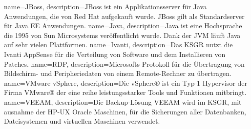 
\makenoidxglossaries
{}
{
        name=JBoss,
        description={JBoss ist ein Applikationsserver für \Gls{Java} Anwendungen, die von Red Hat aufgekauft wurde.
        JBoss gilt als Standardserver für Java EE Anwendungen\cite{U4ZJDNI2}.}
}
{
        name=Java,
        description={Java ist eine Hochsprache die 1995 von Sun Microsystems veröffentlicht wurde.
Dank der JVM läuft Java auf sehr vielen Plattformen\cite{6H25Z3UI}.}
}
{
        name=Ivanti,
        description={Das KSGR nutzt die Ivanti AppSense\cite{LPHK6T9X, 8CHLH32N} für die Verteilung von Software und dem Installieren von Patches.}
}
{
        name=RDP,
        description={Microsofts Protokoll für die Übertragung von Bildschirm- und Peripheriedaten von einem Remote-Rechner zu übertragen\cite{9PJHPCRS}.}
}
{
        name=VMware vSphere,
        description={Die vSphere® ist ein Typ-1 Hypervisor der Firma VMware® der eine reihe leistungsstarker Tools und Funktionen mitbringt.}
}
{
        name=VEEAM,
        description={Die Backup-Lösung VEEAM wird im KSGR, mit ausnahme der HP-UX Oracle Maschinen, für die Sicherungen aller Datenbanken, Dateisystemen und virtuellen Maschinen verwendet.}
}